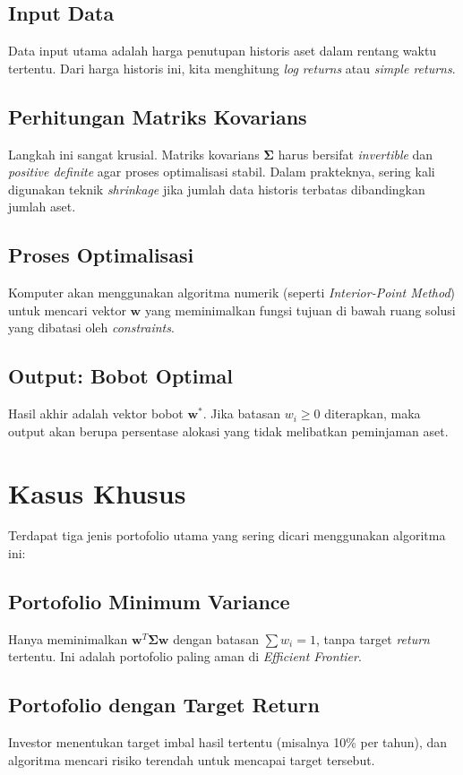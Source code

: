 \documentclass[12pt,a4paper]{book}
\begin{document}
\subsection{Input Data}
Data input utama adalah harga penutupan historis aset dalam rentang waktu tertentu. Dari harga historis ini, kita menghitung \textit{log returns} atau \textit{simple returns}.

\subsection{Perhitungan Matriks Kovarians}
Langkah ini sangat krusial. Matriks kovarians $\mathbf{\Sigma}$ harus bersifat \textit{invertible} dan \textit{positive definite} agar proses optimalisasi stabil. Dalam prakteknya, sering kali digunakan teknik \textit{shrinkage} jika jumlah data historis terbatas dibandingkan jumlah aset.

\subsection{Proses Optimalisasi}
Komputer akan menggunakan algoritma numerik (seperti \textit{Interior-Point Method}) untuk mencari vektor $\mathbf{w}$ yang meminimalkan fungsi tujuan di bawah ruang solusi yang dibatasi oleh \textit{constraints}.

\subsection{Output: Bobot Optimal}
Hasil akhir adalah vektor bobot $\mathbf{w}^*$. Jika batasan $w_i \ge 0$ diterapkan, maka output akan berupa persentase alokasi yang tidak melibatkan peminjaman aset.

\section{Kasus Khusus}
Terdapat tiga jenis portofolio utama yang sering dicari menggunakan algoritma ini:

\subsection{Portofolio Minimum Variance}
Hanya meminimalkan $\mathbf{w}^T \mathbf{\Sigma} \mathbf{w}$ dengan batasan $\sum w_i = 1$, tanpa target \textit{return} tertentu. Ini adalah portofolio paling aman di \textit{Efficient Frontier}.

\subsection{Portofolio dengan Target Return}
Investor menentukan target imbal hasil tertentu (misalnya 10\% per tahun), dan algoritma mencari risiko terendah untuk mencapai target tersebut.
\end{document}
